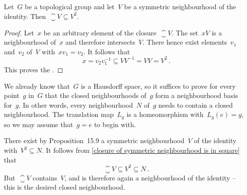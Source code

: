 \subsection{}

\begin{lemma}
	\label{closure of symmetric neighbourhood is in square}
	Let~$G$ be a topological group and let~$V$ be a symmetric neighbourhood of the identity.
	Then~$\closure{V} ⊆ V^2$.
\end{lemma}

\begin{proof}
	Let~$x$ be an arbitrary element of the closure~$\closure{V}$.
	The set~$x V$ is a neighbourhood of~$x$ and therefore intersects~$V$.
	There hence exist elements~$v_1$ and~$v_2$ of~$V$ with~$x v_1 = v_2$.
	It follows that
	\[
		x = v_2 v_1^{-1} ⊆ V V^{-1} = V V = V^2 \,.
	\]
	This proves the .
\end{proof}

We already know that~$G$ is a Hausdorff space, so it suffices to prove for every point~$g$ in~$G$ that the closed neighbourhoods of~$g$ form a neighbourhood basis for~$g$.
In other words, every neighbourhood~$N$ of~$g$ needs to contain a closed neighbourhood.
The translation map~$L_g$ is a homeomorphism with~$L_g(e) = g$, so we may assume that~$g = e$ to begin with.

There exist by Proposition~15.9 a symmetric neighbourhood~$V$ of the identity with~$V^2 ⊆ N$.
It follows from \cref{closure of symmetric neighbourhood is in square} that
\[
	\closure{V}
	⊆
	V^2
	⊆
	N \,.
\]
But~$\closure{V}$ contains~$V$, and is therefore again a neighbourhood of the identity -- this is the desired closed neighbourhood.
